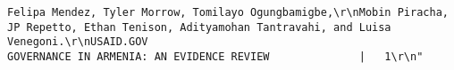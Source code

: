 \documentclass[
]{article}
\begin{document}
\begin{verbatim}
Felipa Mendez, Tyler Morrow, Tomilayo Ogungbamigbe,\r\nMobin Piracha, JP Repetto, Ethan Tenison, Adityamohan Tantravahi, and Luisa Venegoni.\r\nUSAID.GOV                                                           GOVERNANCE IN ARMENIA: AN EVIDENCE REVIEW              |   1\r\n"                                                                                                                                                                                                                                                                                                                                                                                                                                                                                                                                                                                                                                                                                                                                                                                                                                                                                                                                                                                                                                                                                                                                                                                                                                                                                                                                                                                                                                                                                                    

\end{verbatim}
\end{document}
